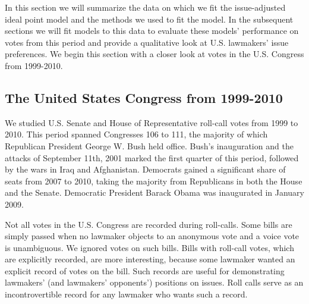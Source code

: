 
        


\label{section:empirical_analysis}

In this section we will summarize the data on which we fit the
issue-adjusted ideal point model and the methods we used to fit the
model. In the subsequent sections we will fit models to this data to
evaluate these models' performance on votes from this period and
provide a qualitative look at U.S. lawmakers' issue preferences. We
begin this section with a closer look at votes in the U.S. Congress
from 1999-2010.

\subsection{The United States Congress from 1999-2010}
We studied U.S. Senate and House of Representative roll-call votes
from 1999 to 2010.  This period spanned Congresses 106 to 111, the
majority of which Republican President George W. Bush held office.
Bush's inauguration and the attacks of September 11th, 2001 marked the
first quarter of this period, followed by the wars in Iraq and
Afghanistan.  Democrats gained a significant share of seats from 2007
to 2010, taking the majority from Republicans in both the House and
the Senate. Democratic President Barack Obama was inaugurated in
January 2009.


Not all votes in the U.S. Congress are recorded during roll-calls.
Some bills are simply passed when no lawmaker objects to an anonymous
vote and a voice vote is unambiguous.  We ignored votes on such bills.
Bills with roll-call votes, which are explicitly recorded, are more
interesting, because some lawmaker wanted an explicit record of votes
on the bill. Such records are useful for demonstrating lawmakers' (and
lawmakers' opponents') positions on issues.  Roll calls serve as an
incontrovertible record for any lawmaker who wants such a record.

